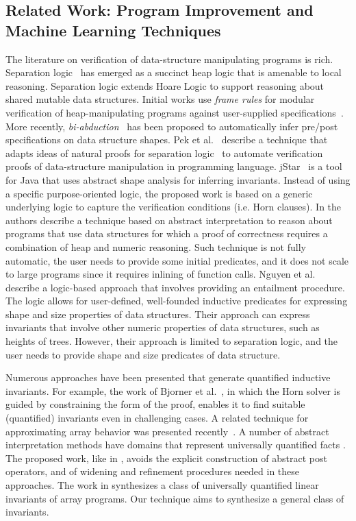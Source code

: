 \subsection{Related Work: Program Improvement and Machine Learning Techniques}
\label{sec-existing}

The literature on verification of data-structure manipulating
programs is rich. Separation logic~\cite{Reynolds02,IshtiaqO01} has
emerged as a succinct heap logic that is amenable to local
reasoning. Separation logic extends Hoare Logic to support reasoning
about shared mutable data structures.
Initial works use {\it frame rules} for modular
verification of heap-manipulating programs
against user-supplied
specifications~\cite{BerdineCO05}.
More recently, {\it
  bi-abduction}~\cite{calcagno2009compositional}
   has been proposed to automatically
infer pre/post specifications on data structure shapes. Pek
et al.~\cite{PekQM14} describe a technique that adapts ideas of
natural proofs for separation logic~\cite{Qiu0SM13} to automate
verification proofs of data-structure manipulation in programming
language. jStar~\cite{DistefanoP08} is a tool for Java that uses
abstract shape analysis for inferring invariants. Instead of using a
specific purpose-oriented logic, the proposed work is based on a generic
underlying logic to capture the verification conditions (i.e. Horn
clauses). In \cite{McCloskeyRS10} the authors describe a technique based on
abstract interpretation to reason about programs that use data structures
for which a proof of correctness requires a combination of heap and numeric
reasoning. Such technique is not fully automatic, the user needs to provide some initial
predicates, and it does not scale to large programs since it requires inlining of
function calls.
Nguyen et al.~\cite{NguyenDQC07} describe a logic-based approach that involves providing
an entailment procedure. The logic allows for user-defined, well-founded inductive
predicates for expressing shape and size properties of data structures. Their
approach can express invariants that involve other numeric properties of data
structures, such as heights of trees. However, their approach
is limited to separation logic, and the user needs to provide
shape and size predicates of data structure.


Numerous approaches have been presented that generate quantified
inductive invariants. For example, the work
of Bjorner et al.\ \cite{BjornerMR13}, in which the Horn solver is
guided by constraining the form of the proof, enables it to find
suitable (quantified) invariants even in challenging cases. A related
technique for approximating array behavior was presented
recently~\cite{DBLP:conf/sas/MonniauxG16}.  A number of abstract
interpretation methods have domains that represent universally
quantified facts \cite{GulwaniMT08,Cousot15}.  The proposed work, like
in \cite{BjornerMR13}, avoids the explicit construction of
abstract post operators, and of widening and refinement procedures needed in
these approaches. The work in \cite{LarrazRR13} synthesizes a class of
universally quantified linear invariants of array programs. Our
technique aims to synthesize a general class of invariants.

